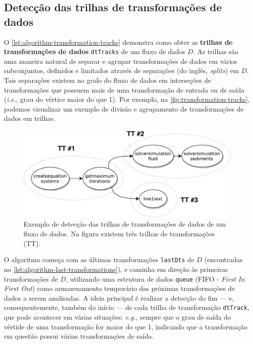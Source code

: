 \subsection{Detecção das trilhas de transformações de dados}%
\label{subsec:deteccao-das-trilhas-de-transformacoes}

O \autoref{lst:algorithm-transformation-tracks} demonstra como obter as \textbf{trilhas de transformações de dados} \texttt{dtTracks} de um fluxo de dados \( D \). As trilhas são uma maneira natural de separar e agrupar transformações de dados em vários subconjuntos, definidos e limitados através de separações (do inglês, \textit{splits}) em \( D \). Tais separações existem no grafo do fluxo de dados em interseções de transformações que possuem mais de uma transformação de entrada ou de saída (\textit{i.e.}, grau do vértice maior do que 1). Por exemplo, na \autoref{fig:transformation-tracks}, podemos visualizar um exemplo de divisão e agrupamento de transformações de dados em trilhas.

\begin{figure}[htb]
    \centering
    \includegraphics[width=\textwidth]{img/transformation-tracks}
    \caption[Exemplo de detecção das trilhas de transformações]{Exemplo de detecção das trilhas de transformações de dados de um fluxo de dados. Na figura existem três trilhas de transformações (\textsc{TT}).}%
    \label{fig:transformation-tracks}
\end{figure}

O algoritmo começa com as últimas transformações \texttt{lastDts} de \( D \) (encontradas no \autoref{lst:algorithm-last-transformations}), e caminha em direção às primeiras transformações de \( D \), utilizando uma estrutura de dados \texttt{queue} (FIFO - \textit{First In First Out}) como armazenamento temporário das próximas transformações de dados a serem analisadas. A ideia principal é realizar a detecção do fim --- e, consequentemente, também do início --- de cada trilha de transformação \texttt{dtTrack}, que pode acontecer em várias situações: \textit{e.g.}, sempre que o grau de saída do vértide de uma transformação for maior do que 1, indicando que a transformação em questão possui várias transformações de saída.

